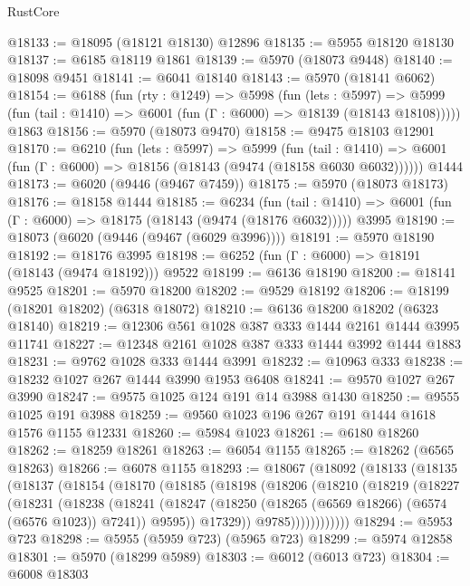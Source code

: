 \begin{lexlean}{RustCore}
\begin{coremodule}
@18133 := @18095 (@18121 @18130) @12896
@18135 := @5955 @18120 @18130
@18137 := @6185 @18119 @1861
@18139 := @5970 (@18073 @9448)
@18140 := @18098 @9451
@18141 := @6041 @18140
@18143 := @5970 (@18141 @6062)
@18154 := @6188
    (fun (rty : @1249) =>
    @5998
      (fun (lets : @5997) =>
      @5999 (fun (tail : @1410) => @6001 (fun (Γ : @6000) => @18139 (@18143 @18108)))))
    @1863
@18156 := @5970 (@18073 @9470)
@18158 := @9475 @18103 @12901
@18170 := @6210
    (fun (lets : @5997) =>
    @5999
      (fun (tail : @1410) =>
      @6001 (fun (Γ : @6000) => @18156 (@18143 (@9474 (@18158 @6030 @6032))))))
    @1444
@18173 := @6020 (@9446 (@9467 @7459))
@18175 := @5970 (@18073 @18173)
@18176 := @18158 @1444
@18185 := @6234
    (fun (tail : @1410) => @6001 (fun (Γ : @6000) => @18175 (@18143 (@9474 (@18176 @6032)))))
    @3995
@18190 := @18073 (@6020 (@9446 (@9467 (@6029 @3996))))
@18191 := @5970 @18190
@18192 := @18176 @3995
@18198 := @6252 (fun (Γ : @6000) => @18191 (@18143 (@9474 @18192))) @9522
@18199 := @6136 @18190
@18200 := @18141 @9525
@18201 := @5970 @18200
@18202 := @9529 @18192
@18206 := @18199 (@18201 @18202) (@6318 @18072)
@18210 := @6136 @18200 @18202 (@6323 @18140)
@18219 := @12306 @561 @1028 @387 @333 @1444 @2161 @1444 @3995 @11741
@18227 := @12348 @2161 @1028 @387 @333 @1444 @3992 @1444 @1883
@18231 := @9762 @1028 @333 @1444 @3991
@18232 := @10963 @333
@18238 := @18232 @1027 @267 @1444 @3990 @1953 @6408
@18241 := @9570 @1027 @267 @3990
@18247 := @9575 @1025 @124 @191 @14 @3988 @1430
@18250 := @9555 @1025 @191 @3988
@18259 := @9560 @1023 @196 @267 @191 @1444 @1618 @1576 @1155 @12331
@18260 := @5984 @1023
@18261 := @6180 @18260
@18262 := @18259 @18261
@18263 := @6054 @1155
@18265 := @18262 (@6565 @18263)
@18266 := @6078 @1155
@18293 := @18067
    (@18092
      (@18133
        (@18135
          (@18137
            (@18154
              (@18170
                (@18185
                  (@18198
                    (@18206
                      (@18210
                        (@18219
                          (@18227
                            (@18231
                              (@18238
                                (@18241
                                  (@18247
                                    (@18250 (@18265 (@6569 @18266) (@6574 (@6576 @1023)) @7241))
                                    @9595))
                                @17329))
                            @9785))))))))))))
@18294 := @5953 @723
@18298 := @5955 (@5959 @723) (@5965 @723)
@18299 := @5974 @12858
@18301 := @5970 (@18299 @5989)
@18303 := @6012 (@6013 @723)
@18304 := @6008 @18303

\end{coremodule}
\end{lexlean}
